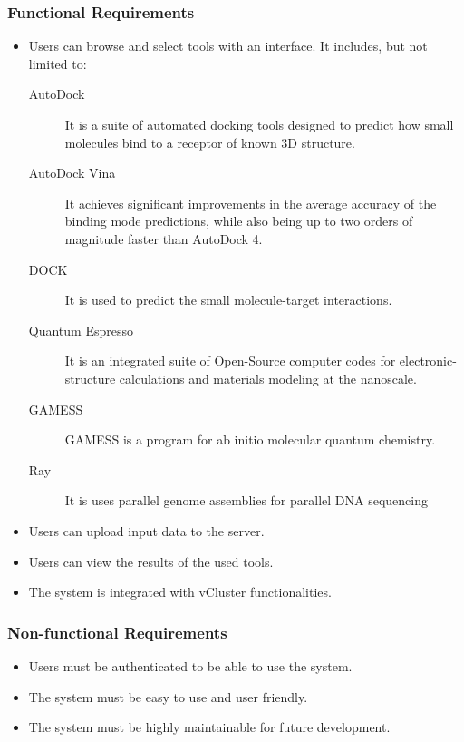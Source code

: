 \documentclass[journal]{./IEEE/IEEEtran}
\begin{document}
        \subsubsection{Functional Requirements}
        \begin{itemize}
          \item Users can browse and select tools with an interface. It includes, but not limited to:
          \begin{description}
          	\item[AutoDock] \hfill \break 
            It is a suite of automated docking tools designed to predict how small molecules bind to a receptor of known 3D structure. \cite{morris2009autodock4}
            \item[AutoDock Vina] \hfill \break
            It achieves significant improvements in the average accuracy of the binding mode predictions, while also being up to two orders of magnitude faster than AutoDock 4. \cite{JCC:JCC21334}
            \item[DOCK] \hfill \break
            It is used to predict the small molecule-target interactions. \cite{lang2009dock}
            \item[Quantum Espresso] \hfill \break
It is an integrated suite of Open-Source computer codes for electronic-structure calculations and materials modeling at the nanoscale. \cite{QE-2009}
            \item[GAMESS] \hfill \break
            GAMESS is a program for ab initio molecular quantum chemistry. \cite{1993gamess}
            \item[Ray] \hfill \break
            It is uses parallel genome assemblies for parallel DNA sequencing \cite{boisvert_ray_2012}
          \end{description}
          \item Users can upload input data to the server.
          \item Users can view the results of the used tools.
          \item The system is integrated with vCluster functionalities.
        \end{itemize}
        \subsubsection{Non-functional Requirements}
        \begin{itemize}
          \item Users must be authenticated to be able to use the system.
          \item The system must be easy to use and user friendly.
          \item The system must be highly maintainable for future development.  
        \end{itemize}
	
\end{document}
